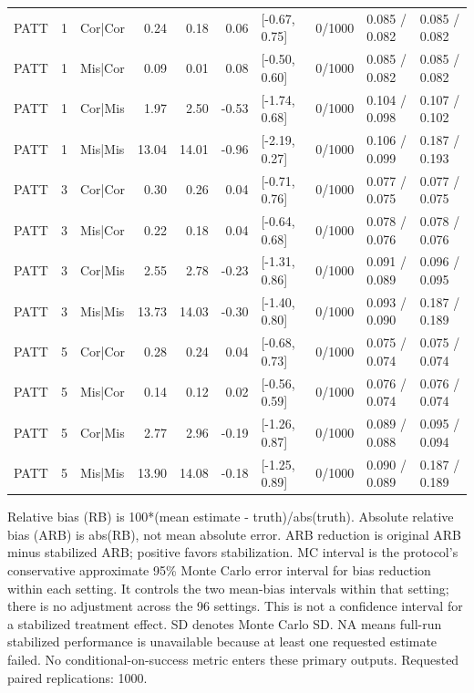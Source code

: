 \begin{table}
\begin{tabular}{lllr r r l r l l}
PATT & 1 & Cor|Cor & 0.24 & 0.18 & 0.06 & [-0.67, 0.75] & 0/1000 & 0.085 / 0.082 & 0.085 / 0.082 \\
PATT & 1 & Mis|Cor & 0.09 & 0.01 & 0.08 & [-0.50, 0.60] & 0/1000 & 0.085 / 0.082 & 0.085 / 0.082 \\
PATT & 1 & Cor|Mis & 1.97 & 2.50 & -0.53 & [-1.74, 0.68] & 0/1000 & 0.104 / 0.098 & 0.107 / 0.102 \\
PATT & 1 & Mis|Mis & 13.04 & 14.01 & -0.96 & [-2.19, 0.27] & 0/1000 & 0.106 / 0.099 & 0.187 / 0.193 \\
PATT & 3 & Cor|Cor & 0.30 & 0.26 & 0.04 & [-0.71, 0.76] & 0/1000 & 0.077 / 0.075 & 0.077 / 0.075 \\
PATT & 3 & Mis|Cor & 0.22 & 0.18 & 0.04 & [-0.64, 0.68] & 0/1000 & 0.078 / 0.076 & 0.078 / 0.076 \\
PATT & 3 & Cor|Mis & 2.55 & 2.78 & -0.23 & [-1.31, 0.86] & 0/1000 & 0.091 / 0.089 & 0.096 / 0.095 \\
PATT & 3 & Mis|Mis & 13.73 & 14.03 & -0.30 & [-1.40, 0.80] & 0/1000 & 0.093 / 0.090 & 0.187 / 0.189 \\
PATT & 5 & Cor|Cor & 0.28 & 0.24 & 0.04 & [-0.68, 0.73] & 0/1000 & 0.075 / 0.074 & 0.075 / 0.074 \\
PATT & 5 & Mis|Cor & 0.14 & 0.12 & 0.02 & [-0.56, 0.59] & 0/1000 & 0.076 / 0.074 & 0.076 / 0.074 \\
PATT & 5 & Cor|Mis & 2.77 & 2.96 & -0.19 & [-1.26, 0.87] & 0/1000 & 0.089 / 0.088 & 0.095 / 0.094 \\
PATT & 5 & Mis|Mis & 13.90 & 14.08 & -0.18 & [-1.25, 0.89] & 0/1000 & 0.090 / 0.089 & 0.187 / 0.189 \\
\bottomrule
\end{tabular}
\vspace{0.5em}
\begin{minipage}{\textwidth}
\footnotesize
Relative bias (RB) is 100*(mean estimate - truth)/abs(truth). Absolute relative bias (ARB) is abs(RB), not mean absolute error. ARB reduction is original ARB minus stabilized ARB; positive favors stabilization. MC interval is the protocol's conservative approximate 95\% Monte Carlo error interval for bias reduction within each setting. It controls the two mean-bias intervals within that setting; there is no adjustment across the 96 settings. This is not a confidence interval for a stabilized treatment effect. SD denotes Monte Carlo SD. NA means full-run stabilized performance is unavailable because at least one requested estimate failed. No conditional-on-success metric enters these primary outputs. Requested paired replications: 1000.
\end{minipage}
\end{table}

